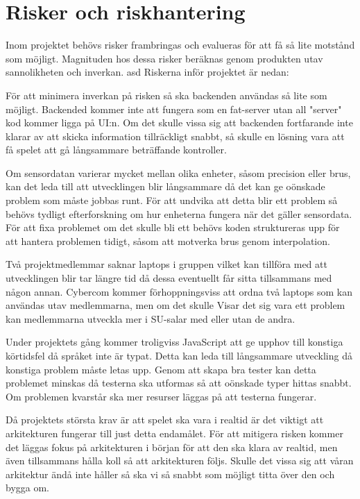 \pagebreak
\section{Risker och riskhantering}
Inom projektet behövs risker frambringas och evalueras för att få så lite motstånd som möjligt. 
Magnituden hos dessa risker beräknas genom produkten utav sannolikheten och inverkan. asd
Riskerna inför projektet är nedan:

{
    För att minimera inverkan på risken så ska backenden användas så lite som möjligt.
    Backended kommer inte att fungera som en fat-server utan all "server" kod kommer ligga på UI:n. 
    Om det skulle vissa sig att backenden fortfarande inte klarar av att skicka information tillräckligt snabbt, 
    så skulle en lösning vara att få spelet att gå långsammare beträffande kontroller.
}

{
    Om sensordatan varierar mycket mellan olika enheter, såsom precision eller brus,
    kan det leda till att utvecklingen blir långsammare då det kan ge oönskade problem som måste jobbas runt.
    För att undvika att detta blir ett problem så behövs tydligt efterforskning om hur enheterna fungera när
    det gäller sensordata. För att fixa problemet om det skulle bli ett behövs koden struktureras upp för att
    hantera problemen tidigt, såsom att motverka brus genom interpolation.
}

{
    Två projektmedlemmar saknar laptops i gruppen vilket kan tillföra med att utvecklingen blir tar längre tid
    då dessa eventuellt får sitta tillsammans med någon annan.
    Cybercom kommer förhoppningsviss att ordna två laptops som kan användas utav medlemmarna, men om det skulle
    Visar det sig vara ett problem kan medlemmarna utveckla mer i SU-salar med eller utan de andra.
}

{
    Under projektets gång kommer troligviss JavaScript att ge upphov till konstiga körtidsfel då språket inte är typat.
    Detta kan leda till långsammare utveckling då konstiga problem måste letas upp.
    Genom att skapa bra tester kan detta problemet minskas då testerna ska utformas så att oönskade typer hittas snabbt.
    Om problemen kvarstår ska mer resurser läggas på att testerna fungerar.
}

{
    Då projektets största krav är att spelet ska vara i realtid är det viktigt att arkitekturen fungerar till just
    detta endamålet.
    För att mitigera risken kommer det läggas fokus på arkitekturen i början för att den ska klara av realtid, 
    men även tillsammans hålla koll så att arkitekturen följs.
    Skulle det vissa sig att våran arkitektur ändå inte håller så ska vi så snabbt som möjligt titta över den och bygga om.
}


